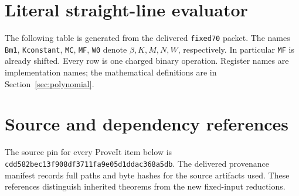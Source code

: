 \documentclass[11pt]{article}
\theoremstyle{definition}
\newcommand{\repo}{\texttt{cdd582bec13f908df3711fa9e05d1ddac368a5db}}
\begin{document}
\appendix
\section{Literal straight-line evaluator}\label{app:circuit}

The following table is generated from the delivered \texttt{fixed70}
packet. The names \texttt{Bm1}, \texttt{Kconstant}, \texttt{MC},
\texttt{MF}, \texttt{W0} denote $\beta,K,M,N,W$, respectively.
In particular \texttt{MF} is already shifted. Every row is one charged
binary operation. Register names are implementation names; the mathematical
definitions are in Section~\ref{sec:polynomial}.





\section{Source and dependency references}

The source pin for every ProveIt item below is \repo. The delivered
provenance manifest records full paths and byte hashes for the source
artifacts used. These references distinguish inherited theorems from the
new fixed-input reductions.
\end{document}
